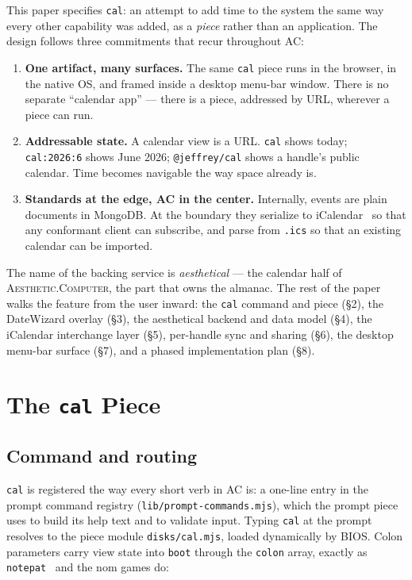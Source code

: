 \documentclass[10pt,letterpaper,twocolumn]{article}
\newcommand{\ac}{\textsc{Aesthetic.Computer}}
\begin{document}
This paper specifies \texttt{cal}: an attempt to add time to the system the same way every other capability was added, as a \emph{piece} rather than an application. The design follows three commitments that recur throughout AC:

\begin{enumerate}
  \item \textbf{One artifact, many surfaces.} The same \texttt{cal} piece runs in the browser, in the native OS, and framed inside a desktop menu-bar window. There is no separate ``calendar app'' --- there is a piece, addressed by URL, wherever a piece can run.
  \item \textbf{Addressable state.} A calendar view is a URL. \texttt{cal} shows today; \texttt{cal:2026:6} shows June 2026; \texttt{@jeffrey/cal} shows a handle's public calendar. Time becomes navigable the way space already is.
  \item \textbf{Standards at the edge, AC in the center.} Internally, events are plain documents in MongoDB. At the boundary they serialize to iCalendar~\citep{rfc5545} so that any conformant client can subscribe, and parse from \texttt{.ics} so that an existing calendar can be imported.
\end{enumerate}

The name of the backing service is \emph{aesthetical} --- the calendar half of \ac{}, the part that owns the almanac. The rest of the paper walks the feature from the user inward: the \texttt{cal} command and piece (\S2), the DateWizard overlay (\S3), the aesthetical backend and data model (\S4), the iCalendar interchange layer (\S5), per-handle sync and sharing (\S6), the desktop menu-bar surface (\S7), and a phased implementation plan (\S8).

\section{The \texttt{cal} Piece}

\subsection{Command and routing}

\texttt{cal} is registered the way every short verb in AC is: a one-line entry in the prompt command registry (\texttt{lib/prompt-commands.mjs}), which the prompt piece uses to build its help text and to validate input. Typing \texttt{cal} at the prompt resolves to the piece module \texttt{disks/cal.mjs}, loaded dynamically by BIOS. Colon parameters carry view state into \texttt{boot} through the \texttt{colon} array, exactly as \texttt{notepat}~\citep{scudder2026notepat} and the nom games do:
\end{document}
